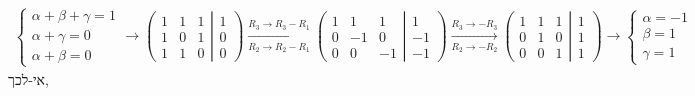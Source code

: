 \documentclass{article}
\begin{document}
\begin{align*}
    \begin{cases}
        \alpha + \beta + \gamma = 1 \\
        \alpha + \gamma = 0         \\
        \alpha + \beta = 0
    \end{cases}
    \rightarrow
    \left(
    \begin{matrix}
            1 & 1 & 1 \\
            1 & 0 & 1 \\
            1 & 1 & 0
        \end{matrix}
    \left|
    \begin{matrix}
            1 \\
            0 \\
            0
        \end{matrix}
    \right.
    \right)
    \xrightarrow[R_2\rightarrow R_2-R_1]{R_3\rightarrow R_3-R_1}
    \left(
    \begin{matrix}
            1 & 1  & 1  \\
            0 & -1 & 0  \\
            0 & 0  & -1
        \end{matrix}
    \left|
    \begin{matrix}
            1  \\
            -1 \\
            -1
        \end{matrix}
    \right.
    \right)
    \xrightarrow[R_2\rightarrow -R_2]{R_3\rightarrow -R_3}
    \left(
    \begin{matrix}
            1 & 1 & 1 \\
            0 & 1 & 0 \\
            0 & 0 & 1
        \end{matrix}
    \left|
    \begin{matrix}
            1 \\
            1 \\
            1
        \end{matrix}
    \right.
    \right)
    \rightarrow
    \begin{cases}
        \alpha=-1 \\
        \beta=1   \\
        \gamma=1
    \end{cases}
\end{align*}
אי-לכך,
\end{document}
